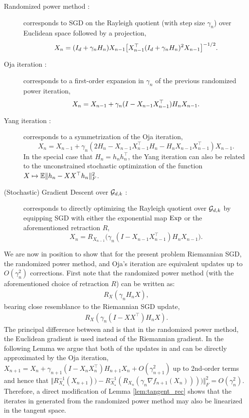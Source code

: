 \begin{description}
\item[Randomized power method \citep{OjaKar85}:] corresponds to  SGD on the Rayleigh quotient (with step size $\gamma_n$) over Euclidean space followed by a projection,
\[
X_n = ( I_d + \gamma_n H_n ) X_{n-1}  \big[ X_{n-1}^\top ( I_d + \gamma_n H_n ) ^{2}X_{n-1}  \big]^{-1/2}.
\]
\item[Oja iteration \citep{Oja82}:]corresponds to a first-order expansion in $\gamma_n$ of the previous randomized power iteration,
\[
 X_n = X_{n-1}  + \gamma_n ( I - X_{n-1} X_{n-1}^\top) H_n  X_{n-1}.
 \]
\item[Yang iteration \citep{Yan95}:] corresponds to a symmetrization of the Oja iteration,
\[
X_{n} =  X_{n-1}  + \gamma_n (2 H_n - X_{n-1} X_{n-1}^\top H_n-  H_n X_{n-1} X_{n-1}^\top)  X_{n-1}.
\]
In the special case that $H_n=h_n h_n^\top$, the Yang iteration can also be related to the unconstrained stochastic optimization of the function $X\mapsto\mathbb{E} \Vert h_n- X X^\top h_n\Vert_F^2$.
\item[(Stochastic) Gradient Descent over $\mathcal{G}_{d,k}$ \citep{bonnabel2013stochastic}:] corresponds to directly optimizing the Rayleigh quotient over $\mathcal{G}_{d,k}$ by equipping SGD with either the exponential map $\Exp$ or the aforementioned retraction $R$,
\[
X_n = R_{X_{n-1}}\big(\gamma_n(I-X_{n-1} X_{n-1}^{\top}) H_n X_{n-1}\big).
\]
\end{description}
We are now in position to show that for the present problem Riemannian SGD, the randomized power method, and Oja's iteration
are equivalent updates up to $O(\gamma_n^2)$ corrections. First note that the randomized power method (with the aforementioned choice of retraction $R$) can be written as:
\begin{align}
  R_{X}(\gamma_n H_nX), \label{eq:rand_power}
\end{align}
bearing close resemblance to the Riemannian SGD update,
\begin{align}
  R_{X}(\gamma_n(I-X X^{\top}) H_nX). \label{eq:rie_sgd}
\end{align}
The principal difference between  and  is that in the randomized power method, the Euclidean gradient is used instead of the Riemannian gradient. In the following Lemma we argue that both of the updates in  and  can be
directly approximated by the Oja iteration, $X_{n+1}=X_n+\gamma_{n+1}(I-X_n X_n^{\top}) H_{n+1}X_n+O(\gamma_{n+1}^2)$ up to
2nd-order terms and hence that $\Vert R_{X_\star}^{-1}(X_{n+1})) -R_{X_\star}^{-1}(R_{X_n}(\gamma_n\nabla f_{n+1}(X_n))))\Vert_F^2=O(\gamma_n^2)$. Therefore, a direct modification of Lemma \ref{lem:tangent_rec} shows that the
iterates in  generated from the randomized power method may also be linearized in the tangent space.

